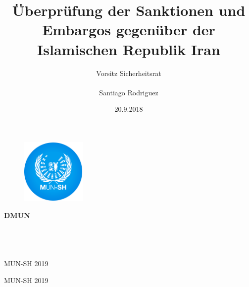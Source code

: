 \documentclass[a4paper,11pt]{article}
\title{Überprüfung der Sanktionen und Embargos gegenüber der Islamischen Republik Iran}
\author{Vorsitz Sicherheitsrat \\ \\ Santiago Rodriguez}
\date{20.9.2018}
\begin{document}
	\begin{titlepage}
		\thispagestyle{empty}
		\begin{figure}
			\includegraphics[width=31.5mm,right]{./munshlogo.png}
		\end{figure}
		\vspace*{-43mm}\hspace{-6mm}\textbf{\textcolor{pantone294}{\large{DMUN}}}\\\\\\\\\\
		\textcolor{pantone294}{MUN-SH 2019}\\
		\vspace{30mm}
		\begin{center}
			\textcolor{pantone294}{\huge{MUN-SH 2019}}\\\vspace*{7mm}
			\textcolor{pantone294}{\huge{\textbf{\thetitle}}}\\\vspace*{10mm}
			\textcolor{pantone294}{\theauthor}\\\vspace*{10mm}
			\textcolor{pantone294}{\thedate}\\\vspace*{20mm}
		\end{center}
	\end{titlepage}
	\makeatother
	\restoregeometry
	\newpage
	
	\tableofcontents
\vspace{2cm}
	
	
\end{document}
